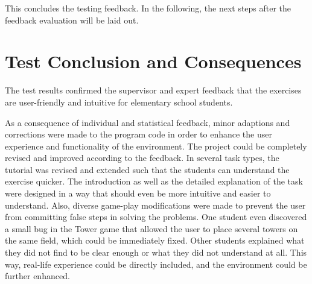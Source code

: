 This concludes the testing feedback. In the following, the next steps after the feedback evaluation will be laid out.

\section{Test Conclusion and Consequences}
\label{section:conclusion}

The test results confirmed the supervisor and expert feedback that the exercises are user-friendly and intuitive for elementary school students.

As a consequence of individual and statistical feedback, minor adaptions and corrections were made to the program code in order to enhance the user experience and functionality of the environment. The project could be completely revised and improved according to the feedback. In several task types, the tutorial was revised and extended such that the students can understand the exercise quicker. The introduction as well as the detailed explanation of the task were designed in a way that should even be more intuitive and easier to understand. 
Also, diverse game-play modifications were made to prevent the user from committing false steps in solving the problems. One student even discovered a small bug in the Tower game that allowed the user to place several towers on the same field, which could be immediately fixed. Other students explained what they did not find to be clear enough or what they did not understand at all. This way, real-life experience could be directly included, and the environment could be further enhanced.